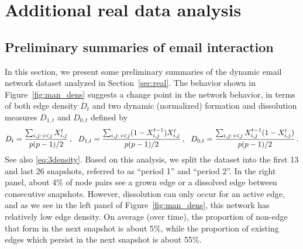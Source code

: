 \documentclass[12pt]{article}
\newcommand{\0}{{\bf 0}}
\begin{document}
\section{Additional real data analysis}
\label{app:add.real}

\subsection{Preliminary summaries of email interaction} \label{subsec:emails_appendix}

In this section, we present some preliminary summaries of the dynamic email network dataset analyzed in Section~\ref{sec:real}.
The behavior shown in Figure~\ref{fig:man_dens} suggests a change point in the network behavior, in terms of both edge density $D_t$ and two dynamic (normalized) formation and dissolution measures $D_{1,t}$ and $D_{0,t}$ defined by
\begin{equation*}
D_t= {\sum_{i,j:\,i < j} X_{i,j}^t \over p(p-1)/2}\,, ~~
D_{1,t} = \frac{\sum_{i,j:\,i < j} (1-X_{i,j}^{t-1}) X_{i,j}^t}{p(p-1)/2}\,,
~~ 
D_{0,t} = \frac{\sum_{i,j:\,i< j} X_{i,j}^{t-1} (1-X_{i,j}^t)}{p(p-1)/2}\,.
\end{equation*}
See also \eqref{eq:3density}. Based on this analysis, we split the dataset into the first 13 and last 26 snapshots, referred to as ``period 1'' and ``period 2''. 
In the right panel, about 4\% of node pairs see a grown edge or a dissolved edge between consecutive snapshots. 
However, dissolution can only occur for an active edge, and as we see in the left panel of Figure~\ref{fig:man_dens}, this network has relatively low edge density. 
On average (over time), the proportion of non-edge that form in the next snapshot is about 5\%, while the proportion of existing edges which persist in the next snapshot is about 55\%.
\end{document}
